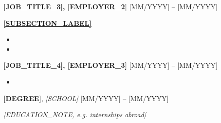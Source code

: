 \documentclass[11pt, a4paper]{\tpl/awesome-cv}
\begin{document}
\begin{cvparagraph}

{\large \textbf{[JOB_TITLE_3], [EMPLOYER_2]}} \hfill [MM/YYYY] -- [MM/YYYY]

\vspace{1mm}

\textbf{\uline{[SUBSECTION_LABEL]}}
\begin{itemize}
\setlength{\itemsep}{0pt}
\setlength{\parskip}{0pt}
    \item [BULLET]
    \item [BULLET]
\end{itemize}

\vspace{2mm}

{\large \textbf{[JOB_TITLE_4], [EMPLOYER_3]}} \hfill [MM/YYYY] -- [MM/YYYY]

\vspace{1mm}
\begin{itemize}
\setlength{\itemsep}{0pt}
\setlength{\parskip}{0pt}
    \item [BULLET]
\end{itemize}
\end{cvparagraph}

\vspace{-2mm}


\textbf{[DEGREE]}, \textit{[SCHOOL]}
{\tiny\href{https://[SCHOOL_URL]}{\faLink}}
\hfill
[MM/YYYY] -- [MM/YYYY]

\vspace{-2mm}

\textit{[EDUCATION_NOTE, e.g. internships abroad]}

\vspace{-2mm}


\noindent
{}

\vspace{-2mm}

\noindent
{}
\end{document}
